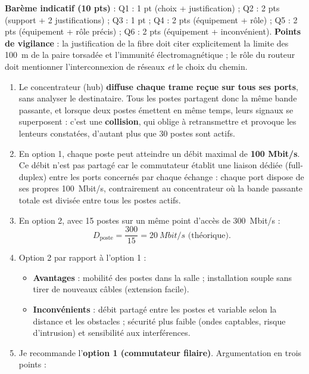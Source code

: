 \documentclass[11pt]{article}
\newcommand{\cle}[1]{{\popxbold\color{popdark}#1}}
\begin{document}
\begin{corrige}
\begin{enumerate}
\end{enumerate}
\textbf{Barème indicatif (10 pts)} : Q1 : 1 pt (choix + justification) ; Q2 : 2 pts (support + 2 justifications) ; Q3 : 1 pt ; Q4 : 2 pts (équipement + rôle) ; Q5 : 2 pts (équipement + rôle précis) ; Q6 : 2 pts (équipement + inconvénient). \textbf{Points de vigilance} : la justification de la fibre doit citer explicitement la limite des \SI{100}{m} de la paire torsadée et l'immunité électromagnétique ; le rôle du routeur doit mentionner l'interconnexion de réseaux \emph{et} le choix du chemin.
\end{corrige}

\begin{corrige}
\begin{enumerate}
  \item Le \cle{concentrateur} (hub) \textbf{diffuse chaque trame reçue sur tous ses ports}, sans analyser le destinataire. Tous les postes partagent donc la même bande passante, et lorsque deux postes émettent en même temps, leurs signaux se superposent : c'est une \textbf{\cle{collision}}, qui oblige à retransmettre et provoque les lenteurs constatées, d'autant plus que 30 postes sont actifs.
  \item En option 1, chaque poste peut atteindre un débit maximal de \textbf{100 Mbit/s}. Ce débit n'est pas partagé car le \cle{commutateur} établit une \cle{liaison dédiée} (full-duplex) entre les ports concernés par chaque échange : chaque port dispose de ses propres \SI{100}{Mbit/s}, contrairement au concentrateur où la bande passante totale est divisée entre tous les postes actifs.
  \item En option 2, avec 15 postes sur un même point d'accès de \SI{300}{Mbit/s} :
  \[ D_{\text{poste}} = \dfrac{300}{15} = \SI{20}{Mbit/s} \text{ (théorique).} \]
  \item Option 2 par rapport à l'option 1 :
  \begin{itemize}
    \item \textbf{Avantages} : \cle{mobilité} des postes dans la salle ; installation souple sans tirer de nouveaux câbles (extension facile).
    \item \textbf{Inconvénients} : débit partagé entre les postes et variable selon la distance et les obstacles ; \cle{sécurité} plus faible (ondes captables, risque d'intrusion) et sensibilité aux \cle{interférences}.
  \end{itemize}
  \item Je recommande l'\textbf{option 1 (commutateur filaire)}. Argumentation en trois points :

\end{enumerate}
\end{corrige}
\end{document}
